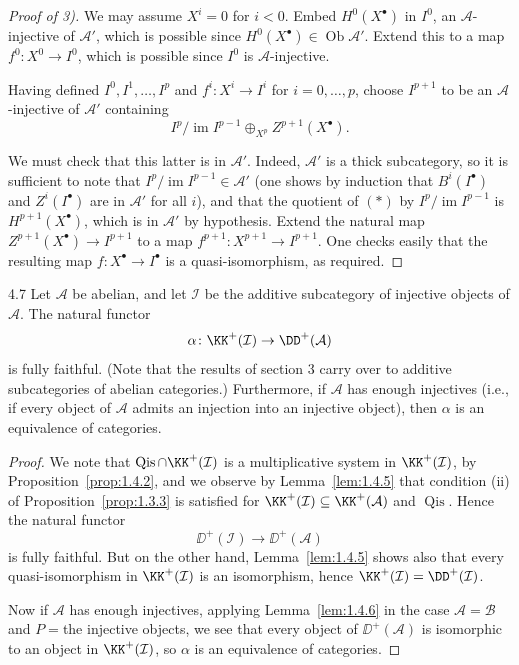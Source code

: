 \begin{proof}[Proof of 3)]
We may assume $X^i=0$ for $i<0$. Embed $H^0(X^\bullet)$ in $I^0$, an $\mathcal{A}$-injective of $\mathcal{A}'$, which is possible since $H^0(X^\bullet)\in\operatorname{Ob}\mathcal{A}'$. Extend this to a map $f^0\colon X^0\to I^0$, which is possible since $I^0$ is $\mathcal{A}$-injective.

Having defined $I^0,I^1,\dots,I^p$ and $f^i\colon X^i\to I^i$ for $i=0,\dots,p$, choose $I^{p+1}$ to be an $\mathcal{A}$-injective of $\mathcal{A}'$ containing
\[
I^p\big/\operatorname{im}I^{p-1} \oplus_{X^p} Z^{p+1}(X^\bullet). \tag{*}
\]

We must check that this latter is in $\mathcal{A}'$. Indeed, $\mathcal{A}'$ is a thick subcategory, so it is sufficient to note that $I^p/\operatorname{im}I^{p-1}\in\mathcal{A}'$ (one shows by induction that $B^i(I^\bullet)$ and $Z^i(I^\bullet)$ are in $\mathcal{A}'$ for all $i$), and that the quotient of $(*)$ by $I^p/\operatorname{im}I^{p-1}$ is $H^{p+1}(X^\bullet)$, which is in $\mathcal{A}'$ by hypothesis. Extend the natural map $Z^{p+1}(X^\bullet)\to I^{p+1}$ to a map $f^{p+1}\colon X^{p+1}\to I^{p+1}$. One checks easily that the resulting map $f\colon X^\bullet\to I^\bullet$ is a quasi-isomorphism, as required.
\end{proof}

\begin{bookproposition}{4.7}\label{prop:1.4.7}
Let $\mathcal{A}$ be abelian, and let $\mathcal{I}$ be the additive subcategory of injective objects of $\mathcal{A}$. The natural functor
\[
\alpha\colon \KK^+(\mathcal{I})\to \DD^+(\mathcal{A})
\]
is fully faithful. (Note that the results of section 3 carry over to additive subcategories of abelian categories.) Furthermore, if $\mathcal{A}$ has enough injectives (i.e., if every object of $\mathcal{A}$ admits an injection into an injective object), then $\alpha$ is an equivalence of categories.
\end{bookproposition}

\begin{proof}
We note that $\operatorname{Qis}\cap\KK^+(\mathcal{I})$ is a multiplicative system in $\KK^+(\mathcal{I})$, by Proposition~\ref{prop:1.4.2}, and we observe by Lemma~\ref{lem:1.4.5} that condition (ii) of Proposition~\ref{prop:1.3.3} is satisfied for $\KK^+(\mathcal{I})\subseteq\KK^+(\mathcal{A})$ and $\operatorname{Qis}$. Hence the natural functor
\[
\DD^+(\mathcal{I}) \longrightarrow \DD^+(\mathcal{A})
\]
is fully faithful. But on the other hand, Lemma~\ref{lem:1.4.5} shows also that every quasi-isomorphism in $\KK^+(\mathcal{I})$ is an isomorphism, hence $\KK^+(\mathcal{I}) = \DD^+(\mathcal{I})$.

Now if $\mathcal{A}$ has enough injectives, applying Lemma~\ref{lem:1.4.6} in the case $\mathcal{A}=\mathcal{B}$ and $P = {}$the injective objects, we see that every object of $\DD^+(\mathcal{A})$ is isomorphic to an object in $\KK^+(\mathcal{I})$, so $\alpha$ is an equivalence of categories.
\end{proof}


